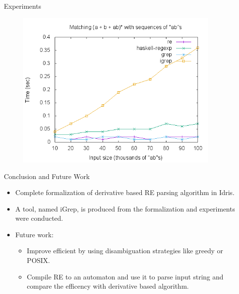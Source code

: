 \documentclass[14pt]{beamer}
\begin{document}
     \begin{frame}{Experiments}
        \begin{figure}[!ht]
           \includegraphics[width=0.9\textwidth]{abs.png}
         \centering
         \label{fig:graph2}
        \end{figure}
     \end{frame}
     \begin{frame}{Conclusion and Future Work}
        \begin{itemize}
           \item Complete formalization of derivative based RE parsing algorithm in Idris.
           \item A tool, named iGrep, is produced from the formalization and experiments were
           conducted.
           \item Future work:
           \begin{itemize}
             \item Improve efficient by using disambiguation strategies like
            greedy or POSIX.
             \item Compile RE to an automaton and use it to parse input string and compare
                the efficency with derivative based algorithm.
             \end{itemize}
        \end{itemize}
     \end{frame}
\end{document}
